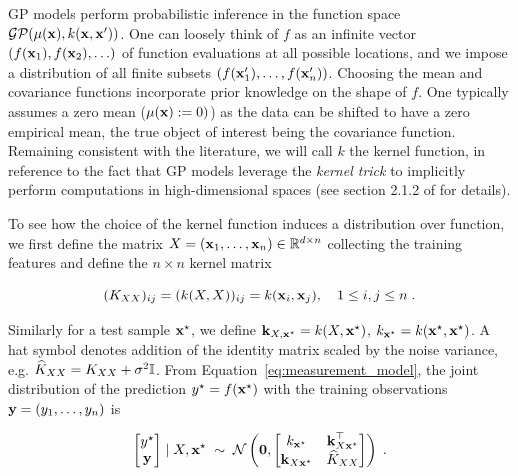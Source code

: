 \documentclass{article}
\begin{document}
GP models perform probabilistic inference in the function space $\mathcal{GP}(\mu(\boldsymbol{\mathbf{x}}), k(\boldsymbol{\mathbf{x}}, \boldsymbol{\mathbf{x}}'))$. One can loosely think of $f$ as an infinite vector $(f(\boldsymbol{\mathbf{x}}_1), f(\boldsymbol{\mathbf{x}}_2), \ldots)$ of function evaluations at all possible locations, and we impose a distribution of all finite subsets $(f(\boldsymbol{\mathbf{x}}'_1), \ldots, f(\boldsymbol{\mathbf{x}}'_n))$. Choosing the mean and covariance functions incorporate prior knowledge on the shape of $f$. 
%
One typically assumes a zero mean ($\mu(\boldsymbol{\mathbf{x}}) := 0)$) as the data can be shifted to have a zero empirical mean, the true object of interest being the covariance function. Remaining consistent with the literature, we will call $k$ the kernel function, in reference to the fact that GP models leverage the \emph{kernel trick} to implicitly perform computations in high-dimensional spaces (see section 2.1.2 of \cite{rasmussen_gaussian_2005} for details).

To see how the choice of the kernel function induces a distribution over function, we first define the matrix $X = (\boldsymbol{\mathbf{x}}_1, \ldots, \boldsymbol{\mathbf{x}}_n) \in \mathbb R^{d \times n}$ collecting the training features and define the $n\times n$ kernel matrix

\begin{equation*}
    (K_{XX})_{ij} = (k(X, X))_{ij} = k(\boldsymbol{\mathbf{x}}_i, \boldsymbol{\mathbf{x}}_j), \quad 1 \le i, j \le n \; .
\end{equation*}

Similarly for a test sample $\boldsymbol{\mathbf{x}}^\star$, we define $\boldsymbol{\mathbf{k}}_{X, \boldsymbol{\mathbf{x}} ^\star} = k(X, \boldsymbol{\mathbf{x}}^\star)$, $k_{\boldsymbol{\mathbf{x}} ^\star} = k(\boldsymbol{\mathbf{x}} ^\star, \boldsymbol{\mathbf{x}} ^\star)$. A hat symbol denotes addition of the identity matrix scaled by the noise variance, e.g. $\widehat K_{XX} = K_{XX} + \sigma^2 \Id$. 
From Equation~\ref{eq:measurement_model}, the joint distribution of the prediction $y^\star = f(\boldsymbol{\mathbf{x}}^\star)$ with the training observations $\boldsymbol{\mathbf{y}} = (y_1, \ldots, y_n)$ is

\begin{equation} \label{eq:prior_dist}
    \begin{bmatrix} y^\star \\ \boldsymbol{\mathbf{y}} \end{bmatrix}
    \mid X, \boldsymbol{\mathbf{x}}^\star
    \; \sim \;
    \mathcal N \left( \boldsymbol{\mathbf{0}}, \begin{bmatrix}
        k_{\boldsymbol{\mathbf{x}}^\star} & \boldsymbol{\mathbf{k}}_{X \boldsymbol{\mathbf{x}}^\star}^\top \\
        \boldsymbol{\mathbf{k}}_{X \boldsymbol{\mathbf{x}}^\star} & \widehat K_{XX}
    \end{bmatrix} \right) \; .
\end{equation}
\end{document}
